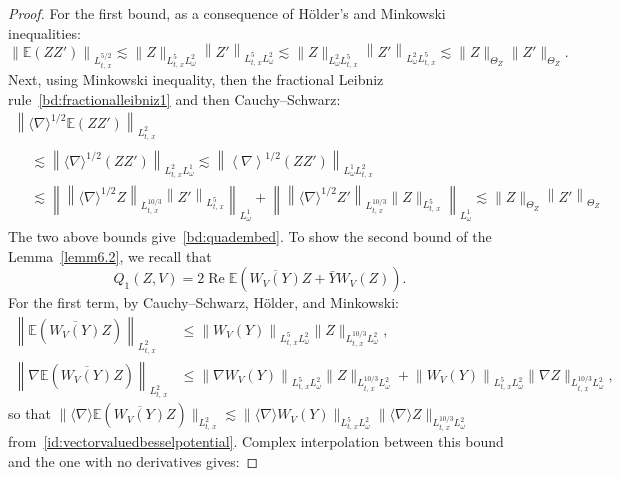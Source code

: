 \documentclass[AHL, Unicode, longabstracts,published]{cedram}
\newcommand{\E}{\mathbb{E}}
\DeclareMathOperator{\Rel}{Re}
\begin{document}
\begin{proof}
For the first bound, as a consequence of H\"older's and Minkowski inequalities:
\[
\left\| \E (ZZ')\right\|_{L^{5/2}_{t,\,x}}\lesssim \| Z\|_{L^5_{t,\,x}L^2_\omega}\left\| Z'\right\|_{L^5_{t,\,x}L^2_\omega}\lesssim \| Z\|_{L^2_\omega L^5_{t,\,x}}\left\| Z'\right\|_{L^2_\omega L^5_{t,\,x}} \lesssim \| Z\|_{\Theta_Z}\| Z'\|_{\Theta_Z}.
\]
Next, using Minkowski inequality, then the fractional Leibniz rule~\eqref{bd:fractionalleibniz1} and then Cauchy--Schwarz:
\begin{multline*}
\left\| \langle \nabla \rangle^{1/2} \E \left(ZZ'\right)\right\|_{L^{2}_{t,\,x}}\\
\begin{aligned}
&\lesssim \left\| \langle \nabla \rangle^{1/2} \left(ZZ'\right)\right\|_{L^{2}_{t,\,x}L^1_\omega}\lesssim \left\| \left\langle \nabla \right\rangle^{1/2} \left(ZZ'\right)\right\|_{L^1_\omega L^{2}_{t,\,x}} \\
&\lesssim \left\| \left\| \langle \nabla \rangle^{1/2} Z \right\|_{L^{10/3}_{t,\,x}} \left\| Z' \right\|_{L^{5}_{t,\,x}}\right\|_{L^1_\omega}+\left\| \left\| \langle \nabla \rangle^{1/2} Z' \right\|_{L^{10/3}_{t,\,x}} \| Z \|_{L^{5}_{t,\,x}}\right\|_{L^1_\omega} \lesssim \| Z \|_{\Theta_Z} \left\| Z'\right\|_{\Theta_Z}
\end{aligned}
\end{multline*}
The two above bounds give~\eqref{bd:quadembed}. To show the second bound of the Lemma~\ref{lemm6.2}, we recall that
\begin{equation} \label{def:Q1inter}
Q_1(Z,V)= 2\Rel \E\left(\overline{W_V(Y)} Z + \bar Y W_V(Z)\right).
\end{equation} 
For the first term, by Cauchy--Schwarz, H\"older, and Minkowski:
\begin{align*}
\left\| \E \left(\overline{W_V(Y)} Z\right) \right\|_{L^2_{t,\,x}} &\leq \left\|W_V(Y)\right\|_{L^5_{t,\,x} L^2_\omega} \|Z\|_{L^{10/3}_{t,\,x} L^2_\omega},
\\
\left\| \nabla \E \left(\overline{W_V(Y)} Z\right) \right\|_{L^2_{t,\,x}} &\leq \left\| \nabla W_V(Y)\right\|_{L^5_{t,\,x} L^2_\omega} \|Z\|_{L^{10/3}_{t,\,x} L^2_\omega} + \left\| W_V(Y)\right\|_{L^5_{t,\,x} L^2_\omega} \| \nabla Z\|_{L^{10/3}_{t,\,x} L^2_\omega},
\end{align*}
so that $\| \langle \nabla \rangle \E (\overline{W_V(Y)} Z)\|_{L^2_{t,\,x}}\lesssim \| \langle \nabla \rangle W_V(Y) \|_{L^5_{t,\,x} L^2_\omega}\| \langle \nabla \rangle Z \|_{L^{10/3}_{t,\,x} L^2_\omega}$ from~\eqref{id:vectorvaluedbesselpotential}. Complex interpolation between this bound and the one with no derivatives gives:

\end{proof}
\end{document}
